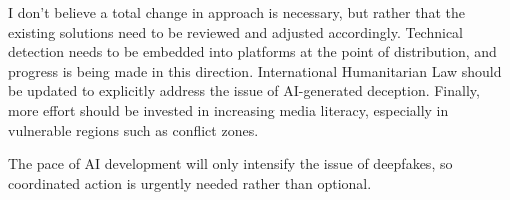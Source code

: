 I don't believe a total change in approach is necessary, but rather that the existing solutions need to be reviewed and adjusted accordingly. Technical detection needs to be embedded into platforms at the point of distribution, and progress is being made in this direction. International Humanitarian Law should be updated to explicitly address the issue of AI-generated deception. Finally, more effort should be invested in increasing media literacy, especially in vulnerable regions such as conflict zones.

The pace of AI development will only intensify the issue of deepfakes, so coordinated action is urgently needed rather than optional.